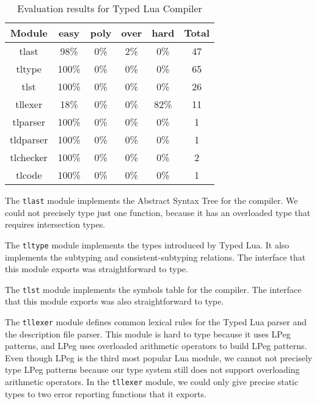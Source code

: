 \begin{table}[!ht]
\begin{center}
\begin{tabular}{|c|c|c|c|c|c|}
\hline
\textbf{Module} & \textbf{easy} & \textbf{poly} & \textbf{over} & \textbf{hard} & \textbf{Total} \\
\hline
tlast & 98\% & 0\% & 2\% & 0\% & 47 \\ %
\hline
tltype & 100\% & 0\% & 0\% & 0\% & 65 \\ %
\hline
tlst & 100\% & 0\% & 0\% & 0\% & 26 \\ %
\hline
tllexer & 18\% & 0\% & 0\% & 82\% & 11 \\ %
\hline
tlparser & 100\% & 0\% & 0\% & 0\% & 1 \\ %
\hline
tldparser & 100\% & 0\% & 0\% & 0\% & 1 \\ %
\hline
tlchecker & 100\% & 0\% & 0\% & 0\% & 2 \\ %
\hline
tlcode & 100\% & 0\% & 0\% & 0\% & 1 \\ %
\hline
\end{tabular}
\end{center}
\caption{Evaluation results for Typed Lua Compiler}
\label{tab:evaltlc}
\end{table}

The \texttt{tlast} module implements the Abstract Syntax Tree for
the compiler.
We could not precisely type just one function, because it has
an overloaded type that requires intersection types.

The \texttt{tltype} module implements the types introduced by Typed Lua.
It also implements the subtyping and consistent-subtyping relations.
The interface that this module exports was straightforward to type.

The \texttt{tlst} module implements the symbols table for the compiler.
The interface that this module exports was also straightforward to type.

The \texttt{tllexer} module defines common lexical rules for
the Typed Lua parser and the description file parser.
This module is hard to type because it uses LPeg \cite{lpeg,ierusalimschy2009lpeg}
patterns, and LPeg uses overloaded arithmetic operators to
build LPeg patterns. 
Even though LPeg is the third most popular Lua module,
we cannot not precisely type LPeg patterns because our
type system still does not support overloading arithmetic
operators.
In the \texttt{tllexer} module, we could only give precise static types
to two error reporting functions that it exports.

